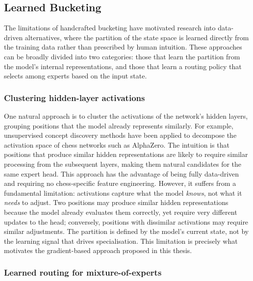 \subsection{Learned Bucketing}\label{sec:learned-bucketing}

The limitations of handcrafted bucketing have motivated research into data-driven alternatives, where the partition of the state space is learned directly from the training data rather than prescribed by human intuition. These approaches can be broadly divided into two categories: those that learn the partition from the model's internal representations, and those that learn a routing policy that selects among experts based on the input state.

\subsubsection{Clustering hidden-layer activations}\label{sec:act-clustering}

One natural approach is to cluster the activations of the network's hidden layers, grouping positions that the model already represents similarly. For example, unsupervised concept discovery methods have been applied to decompose the activation space of chess networks such as AlphaZero. The intuition is that positions that produce similar hidden representations are likely to require similar processing from the subsequent layers, making them natural candidates for the same expert head. This approach has the advantage of being fully data-driven and requiring no chess-specific feature engineering. However, it suffers from a fundamental limitation: activations capture what the model \emph{knows}, not what it \emph{needs} to adjust. Two positions may produce similar hidden representations because the model already evaluates them correctly, yet require very different updates to the head; conversely, positions with dissimilar activations may require similar adjustments. The partition is defined by the model's current state, not by the learning signal that drives specialisation. This limitation is precisely what motivates the gradient-based approach proposed in this thesis.

\subsubsection{Learned routing for mixture-of-experts}\label{sec:learned-routing-chess}

